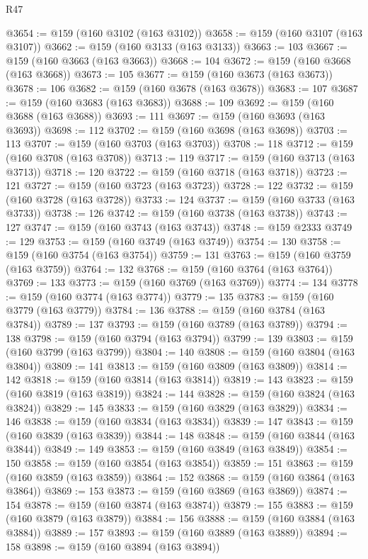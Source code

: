 \begin{lexlean}{R47}
\begin{coremodule}
@3654 := @159 (@160 @3102 (@163 @3102))
@3658 := @159 (@160 @3107 (@163 @3107))
@3662 := @159 (@160 @3133 (@163 @3133))
@3663 := 103
@3667 := @159 (@160 @3663 (@163 @3663))
@3668 := 104
@3672 := @159 (@160 @3668 (@163 @3668))
@3673 := 105
@3677 := @159 (@160 @3673 (@163 @3673))
@3678 := 106
@3682 := @159 (@160 @3678 (@163 @3678))
@3683 := 107
@3687 := @159 (@160 @3683 (@163 @3683))
@3688 := 109
@3692 := @159 (@160 @3688 (@163 @3688))
@3693 := 111
@3697 := @159 (@160 @3693 (@163 @3693))
@3698 := 112
@3702 := @159 (@160 @3698 (@163 @3698))
@3703 := 113
@3707 := @159 (@160 @3703 (@163 @3703))
@3708 := 118
@3712 := @159 (@160 @3708 (@163 @3708))
@3713 := 119
@3717 := @159 (@160 @3713 (@163 @3713))
@3718 := 120
@3722 := @159 (@160 @3718 (@163 @3718))
@3723 := 121
@3727 := @159 (@160 @3723 (@163 @3723))
@3728 := 122
@3732 := @159 (@160 @3728 (@163 @3728))
@3733 := 124
@3737 := @159 (@160 @3733 (@163 @3733))
@3738 := 126
@3742 := @159 (@160 @3738 (@163 @3738))
@3743 := 127
@3747 := @159 (@160 @3743 (@163 @3743))
@3748 := @159 @2333
@3749 := 129
@3753 := @159 (@160 @3749 (@163 @3749))
@3754 := 130
@3758 := @159 (@160 @3754 (@163 @3754))
@3759 := 131
@3763 := @159 (@160 @3759 (@163 @3759))
@3764 := 132
@3768 := @159 (@160 @3764 (@163 @3764))
@3769 := 133
@3773 := @159 (@160 @3769 (@163 @3769))
@3774 := 134
@3778 := @159 (@160 @3774 (@163 @3774))
@3779 := 135
@3783 := @159 (@160 @3779 (@163 @3779))
@3784 := 136
@3788 := @159 (@160 @3784 (@163 @3784))
@3789 := 137
@3793 := @159 (@160 @3789 (@163 @3789))
@3794 := 138
@3798 := @159 (@160 @3794 (@163 @3794))
@3799 := 139
@3803 := @159 (@160 @3799 (@163 @3799))
@3804 := 140
@3808 := @159 (@160 @3804 (@163 @3804))
@3809 := 141
@3813 := @159 (@160 @3809 (@163 @3809))
@3814 := 142
@3818 := @159 (@160 @3814 (@163 @3814))
@3819 := 143
@3823 := @159 (@160 @3819 (@163 @3819))
@3824 := 144
@3828 := @159 (@160 @3824 (@163 @3824))
@3829 := 145
@3833 := @159 (@160 @3829 (@163 @3829))
@3834 := 146
@3838 := @159 (@160 @3834 (@163 @3834))
@3839 := 147
@3843 := @159 (@160 @3839 (@163 @3839))
@3844 := 148
@3848 := @159 (@160 @3844 (@163 @3844))
@3849 := 149
@3853 := @159 (@160 @3849 (@163 @3849))
@3854 := 150
@3858 := @159 (@160 @3854 (@163 @3854))
@3859 := 151
@3863 := @159 (@160 @3859 (@163 @3859))
@3864 := 152
@3868 := @159 (@160 @3864 (@163 @3864))
@3869 := 153
@3873 := @159 (@160 @3869 (@163 @3869))
@3874 := 154
@3878 := @159 (@160 @3874 (@163 @3874))
@3879 := 155
@3883 := @159 (@160 @3879 (@163 @3879))
@3884 := 156
@3888 := @159 (@160 @3884 (@163 @3884))
@3889 := 157
@3893 := @159 (@160 @3889 (@163 @3889))
@3894 := 158
@3898 := @159 (@160 @3894 (@163 @3894))

\end{coremodule}
\end{lexlean}
